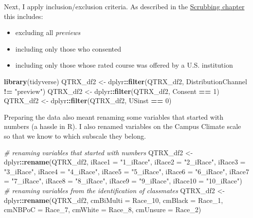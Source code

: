 \documentclass[
  11pt,
]{book}
\newenvironment{Shaded}{\begin{snugshade}}{\end{snugshade}}
\newcommand{\AttributeTok}[1]{\textcolor[rgb]{0.27,0.27,0.27}{#1}}
\newcommand{\CommentTok}[1]{\textcolor[rgb]{0.37,0.37,0.37}{\textit{#1}}}
\newcommand{\DecValTok}[1]{\textcolor[rgb]{0.06,0.06,0.06}{#1}}
\newcommand{\FunctionTok}[1]{\textcolor[rgb]{0.27,0.27,0.27}{\textbf{#1}}}
\newcommand{\NormalTok}[1]{#1}
\newcommand{\OtherTok}[1]{\textcolor[rgb]{0.37,0.37,0.37}{#1}}
\newcommand{\SpecialCharTok}[1]{\textcolor[rgb]{0.43,0.43,0.43}{\textbf{#1}}}
\newcommand{\StringTok}[1]{\textcolor[rgb]{0.5,0.5,0.5}{#1}}
\providecommand{\tightlist}{%
  \setlength{\itemsep}{0pt}\setlength{\parskip}{0pt}}
\begin{document}
Next, I apply inclusion/exclusion criteria. As described in the \protect\hyperlink{scrub}{Scrubbing chapter} this includes:

\begin{itemize}
\tightlist
\item
  excluding all \emph{previews}
\item
  including only those who consented
\item
  including only those whose rated course was offered by a U.S. institution
\end{itemize}

\begin{Shaded}
\begin{Highlighting}[]
\FunctionTok{library}\NormalTok{(tidyverse)}
\NormalTok{QTRX\_df2 }\OtherTok{\textless{}{-}}\NormalTok{ dplyr}\SpecialCharTok{::}\FunctionTok{filter}\NormalTok{(QTRX\_df2, DistributionChannel }\SpecialCharTok{!=} \StringTok{"preview"}\NormalTok{)}
\NormalTok{QTRX\_df2 }\OtherTok{\textless{}{-}}\NormalTok{ dplyr}\SpecialCharTok{::}\FunctionTok{filter}\NormalTok{(QTRX\_df2, Consent }\SpecialCharTok{==} \DecValTok{1}\NormalTok{)}
\NormalTok{QTRX\_df2 }\OtherTok{\textless{}{-}}\NormalTok{ dplyr}\SpecialCharTok{::}\FunctionTok{filter}\NormalTok{(QTRX\_df2, USinst }\SpecialCharTok{==} \DecValTok{0}\NormalTok{)}
\end{Highlighting}
\end{Shaded}

Preparing the data also meant renaming some variables that started with numbers (a hassle in R). I also renamed variables on the Campus Climate scale so that we know to which subscale they belong.

\begin{Shaded}
\begin{Highlighting}[]
\CommentTok{\# renaming variables that started with numbers}
\NormalTok{QTRX\_df2 }\OtherTok{\textless{}{-}}\NormalTok{ dplyr}\SpecialCharTok{::}\FunctionTok{rename}\NormalTok{(QTRX\_df2, }\AttributeTok{iRace1 =} \StringTok{"1\_iRace"}\NormalTok{, }\AttributeTok{iRace2 =} \StringTok{"2\_iRace"}\NormalTok{,}
    \AttributeTok{iRace3 =} \StringTok{"3\_iRace"}\NormalTok{, }\AttributeTok{iRace4 =} \StringTok{"4\_iRace"}\NormalTok{, }\AttributeTok{iRace5 =} \StringTok{"5\_iRace"}\NormalTok{, }\AttributeTok{iRace6 =} \StringTok{"6\_iRace"}\NormalTok{,}
    \AttributeTok{iRace7 =} \StringTok{"7\_iRace"}\NormalTok{, }\AttributeTok{iRace8 =} \StringTok{"8\_iRace"}\NormalTok{, }\AttributeTok{iRace9 =} \StringTok{"9\_iRace"}\NormalTok{, }\AttributeTok{iRace10 =} \StringTok{"10\_iRace"}\NormalTok{)}
\CommentTok{\# renaming variables from the identification of classmates}
\NormalTok{QTRX\_df2 }\OtherTok{\textless{}{-}}\NormalTok{ dplyr}\SpecialCharTok{::}\FunctionTok{rename}\NormalTok{(QTRX\_df2, }\AttributeTok{cmBiMulti =}\NormalTok{ Race\_10, }\AttributeTok{cmBlack =}\NormalTok{ Race\_1,}
    \AttributeTok{cmNBPoC =}\NormalTok{ Race\_7, }\AttributeTok{cmWhite =}\NormalTok{ Race\_8, }\AttributeTok{cmUnsure =}\NormalTok{ Race\_2)}
\end{Highlighting}
\end{Shaded}
\end{document}

